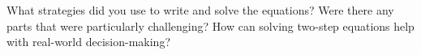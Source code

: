 \documentclass[12pt]{article}
\begin{document}
\vspace{1em}

\begin{tcolorbox}[colframe=black!60, colback=white, 
coltitle=black, colbacktitle=black!15, fonttitle=\bfseries\Large, 
title=Reflection, halign title=center, left=10pt, right=10pt, top=10pt, bottom=80pt]
What strategies did you use to write and solve the equations? Were there any parts that were particularly challenging? How can solving two-step equations help with real-world decision-making?
\end{tcolorbox}
\end{document}
